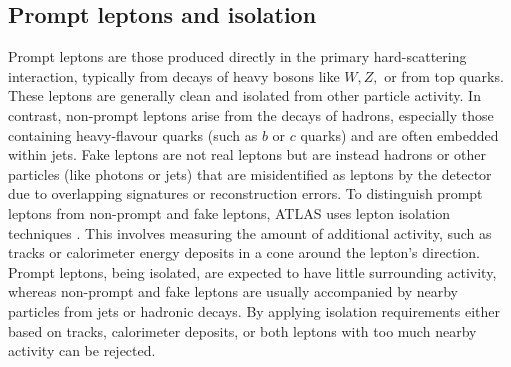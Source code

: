 \subsection{Prompt leptons and isolation}
Prompt leptons are those produced directly in the primary hard-scattering interaction, typically from decays of heavy bosons like $W, Z,$ or from top quarks. These leptons are generally clean and isolated from other particle activity. In contrast, non-prompt leptons arise from the decays of hadrons, especially those containing heavy-flavour quarks (such as $b$ or $c$ quarks) and are often embedded within jets. Fake leptons are not real leptons but are instead hadrons or other particles (like photons or jets) that are misidentified as leptons by the detector due to overlapping signatures or reconstruction errors.
To distinguish prompt leptons from non-prompt and fake leptons, ATLAS uses lepton isolation techniques \cite{prompt}. This involves measuring the amount of additional activity, such as tracks or calorimeter energy deposits in a cone around the lepton’s direction. Prompt leptons, being isolated, are expected to have little surrounding activity, whereas non-prompt and fake leptons are usually accompanied by nearby particles from jets or hadronic decays. By applying isolation requirements either based on tracks, calorimeter deposits, or both leptons with too much nearby activity can be rejected.

